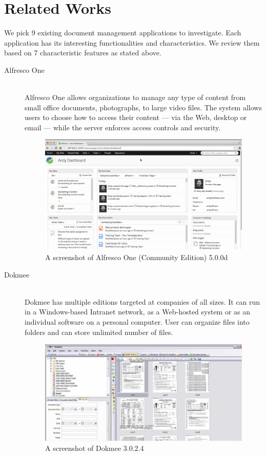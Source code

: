 \section{Related Works} \label{relate-works}
We pick 9 existing document management applications to investigate.
Each application has its interesting functionalities and characteristics.
We review them based on 7 characteristic features as stated above.

\begin{description}
\item[Alfresco One] \hfill \\
Alfresco One allows organizations to manage any type of content from small office documents, photographs, to large video files.
The system allows users to choose how to access their content --- via the Web, desktop or email --- while the server enforces access controls and security.
\begin{figure}[h]
	\centering
	\includegraphics[scale=0.4]{res/literature/screenshot_alfresco}
	\caption{A screenshot of Alfresco One (Community Edition) 5.0.0d  \cite{alfresco}}
\end{figure}

\item[Dokmee] \hfill \\
Dokmee has multiple editions targeted at companies of all sizes.
It can run in a Windows-based Intranet network, as a Web-hosted system or as an individual software on a personal computer.
User can organize files into folders and can store unlimited number of files.
\begin{figure}[ht]
	\centering
	\includegraphics[scale=0.55]{res/literature/screenshot_dokmee}
	\caption{A screenshot of Dokmee 3.0.2.4  \cite{dokmee}}
\end{figure}


\end{description}
